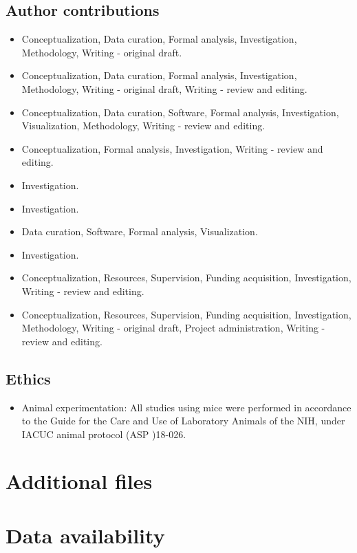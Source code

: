 \documentclass[11pt,a4paper]{article}
\begin{document}
\subsection{Author contributions}

\begin{itemize}
\item Conceptualization, Data curation, Formal analysis, Investigation, Methodology, Writing - original draft.
\item Conceptualization, Data curation, Formal analysis, Investigation, Methodology, Writing - original draft, Writing - review and editing.
\item Conceptualization, Data curation, Software, Formal analysis, Investigation, Visualization, Methodology, Writing - review and editing.
\item Conceptualization, Formal analysis, Investigation, Writing - review and editing.
\item Investigation.
\item Investigation.
\item Data curation, Software, Formal analysis, Visualization.
\item Investigation.
\item Conceptualization, Resources, Supervision, Funding acquisition, Investigation, Writing - review and editing.
\item Conceptualization, Resources, Supervision, Funding acquisition, Investigation, Methodology, Writing - original draft, Project administration, Writing - review and editing.
\end{itemize}

\subsection{Ethics}

\begin{itemize}
\item Animal experimentation: All studies using mice were performed in accordance to the Guide for the Care and Use of Laboratory Animals of the NIH, under IACUC animal protocol (ASP )18-026.
\end{itemize}

\section{Additional files}

\section{Data availability}
\end{document}
